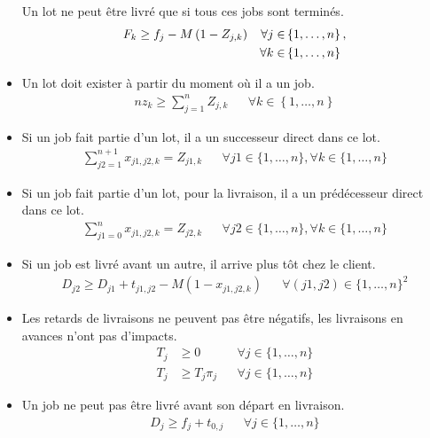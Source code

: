 \begin{itemize}
	      Un lot ne peut être livré que si tous ces jobs sont terminés.
	      \begin{align}
		      F_k \geq f_{j} - M\left(1-Z_{j,k}\right) &  & \forall j \in & \left\{1,\dotsc, n \right\}, \notag \\
		                                                 &  & \forall k \in & \left\{1,\dotsc, n \right\}
	      \end{align}
	\item
	      Un lot doit exister à partir du moment où il a un job.
	      \begin{align}
		      n z_k\geq\sum_{j=1}^{n}Z_{j,k} &  &
		      \forall k \in\left\{1,\dotsc,n \right\}
	      \end{align}

	\item
	      Si un job fait partie d’un lot, il a un successeur direct dans ce lot.
	      \begin{align}
		      \sum_{j2=1}^{n+1} x_{j1,j2,k} = Z_{j1,k} &  &
		      \forall j1 \in\{ 1, \ldots, n\}, \forall k \in\{1, \ldots, n\}
	      \end{align}
	\item
	      Si un job fait partie d’un lot, pour la livraison, il a un prédécesseur direct dans ce lot.
	      \begin{align}
		      \sum_{j1=0}^{n} x_{j1,j2,k} = Z_{j2,k} &  &
		      \forall j2 \in\{ 1, \ldots, n\}, \forall k \in\{1, \ldots, n\}
	      \end{align}
	\item
	      Si un job est livré avant un autre, il arrive plus tôt chez le client.
	      \begin{align}
		      D_{j2}\geq D_{j1} + t_{j1,j2} - M \left(1-x_{j1,j2,k} \right)
			& &
			\forall (j1, j2) \in \{ 1, \ldots, n \}^2
	      \end{align}
	\item
	      Les retards de livraisons ne peuvent pas être négatifs,
	      les livraisons en avances n’ont pas d’impacts.
	      \begin{align}
		      T_j & \geq 0         &  & \forall j \in\{1, \ldots, n\} \\
		      T_j & \geq T_j \pi_j &  & \forall j \in\{1, \ldots, n\}
	      \end{align}
	\item
	      Un job ne peut pas être livré avant son départ en livraison.
	      \begin{align}
		      D_j \geq f_j + t_{0, j} &  & \forall j \in\{1, \ldots, n\}
	      \end{align}
\end{itemize}
